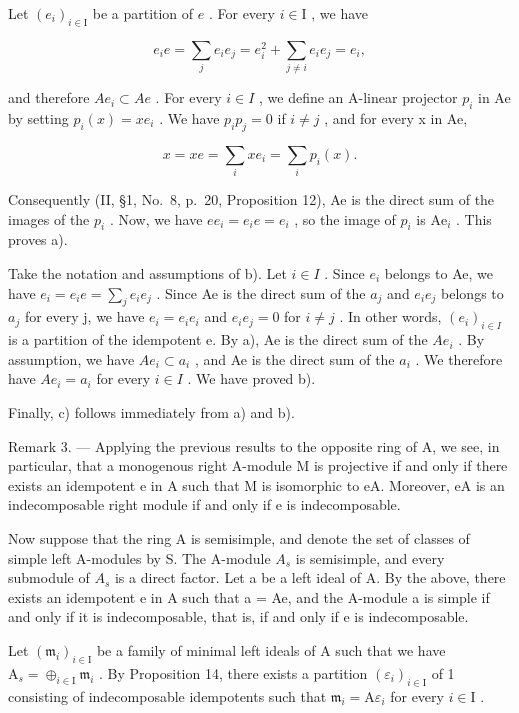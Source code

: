 Let \((e_i)_{i\in \mathrm{I}}\) be a partition of \(e\) . For every \(i\in \mathrm{I}\) , we have

\[
e _ {i} e = \sum_ {j} e _ {i} e _ {j} = e _ {i} ^ {2} + \sum_ {j \neq i} e _ {i} e _ {j} = e _ {i},
\]

and therefore \(Ae_{i} \subset Ae\) . For every \(i \in I\) , we define an A-linear projector \(p_{i}\) in Ae by setting \(p_{i}(x) = xe_{i}\) . We have \(p_{i}p_{j} = 0\) if \(i \neq j\) , and for every x in Ae,

\[
x = x e = \sum_ {i} x e _ {i} = \sum_ {i} p _ {i} (x).
\]

Consequently (II, §1, No.~8, p.~20, Proposition 12), Ae is the direct sum of the images of the \(p_i\) . Now, we have \(ee_i = e_i e = e_i\) , so the image of \(p_i\) is \(\mathrm{Ae}_i\) . This proves a).

Take the notation and assumptions of b). Let \(i \in I\) . Since \(e_{i}\) belongs to Ae, we have \(e_{i} = e_{i}e = \sum_{j} e_{i}e_{j}\) . Since Ae is the direct sum of the \(a_{j}\) and \(e_{i}e_{j}\) belongs to \(a_{j}\) for every j, we have \(e_{i} = e_{i}e_{i}\) and \(e_{i}e_{j} = 0\) for \(i \neq j\) . In other words, \((e_{i})_{i \in I}\) is a partition of the idempotent e. By a), Ae is the direct sum of the \(Ae_{i}\) . By assumption, we have \(Ae_{i} \subset a_{i}\) , and Ae is the direct sum of the \(a_{i}\) . We therefore have \(Ae_{i} = a_{i}\) for every \(i \in I\) . We have proved b).

Finally, c) follows immediately from a) and b).

Remark 3. --- Applying the previous results to the opposite ring of A, we see, in particular, that a monogenous right A-module M is projective if and only if there exists an idempotent e in A such that M is isomorphic to eA. Moreover, eA is an indecomposable right module if and only if e is indecomposable.

Now suppose that the ring A is semisimple, and denote the set of classes of simple left A-modules by S. The A-module \(A_{s}\) is semisimple, and every submodule of \(A_{s}\) is a direct factor. Let a be a left ideal of A. By the above, there exists an idempotent e in A such that a = Ae, and the A-module a is simple if and only if it is indecomposable, that is, if and only if e is indecomposable.

Let \((\mathfrak{m}_i)_{i\in \mathrm{I}}\) be a family of minimal left ideals of A such that we have \(\mathrm{A}_s = \oplus_{i\in \mathrm{I}}\mathfrak{m}_i\) . By Proposition 14, there exists a partition \((\varepsilon_i)_{i\in \mathrm{I}}\) of 1 consisting of indecomposable idempotents such that \(\mathfrak{m}_i = \mathrm{A}\varepsilon_i\) for every \(i\in \mathrm{I}\) .

